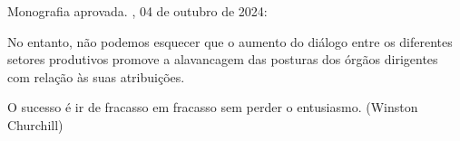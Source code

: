 \documentclass[
	12pt,				%
	oneside,			%
	a4paper,			%
	english,			%
	french,				%
	spanish,			%
	brazil				%
	]{abntex2}
\renewcommand{\ABNTEXchapterfont}{\normalfont} %
\begin{document}
\begin{folhadeaprovacao}

  \begin{center}
    {\ABNTEXchapterfont\large\imprimirautor}

    \vspace*{\fill}\vspace*{\fill}
    \begin{center}
      \ABNTEXchapterfont\bfseries\Large\imprimirtitulo
    \end{center}
    \vspace*{\fill}

    \hspace{.45\textwidth}
    \begin{minipage}{.5\textwidth}

    \imprimirpreambulo

    \end{minipage}%
    \vspace*{\fill}
   \end{center}

   Monografia aprovada. \imprimirlocal, 04 de outubro de 2024:


   \begin{center}
    \vspace*{0.5cm}
    {\large\imprimirlocal}
    \par
    {\large\imprimirdata}
    \vspace*{1cm}
  \end{center}

\end{folhadeaprovacao}
\begin{agradecimentos}

No entanto, não podemos esquecer que o aumento do diálogo entre os
diferentes setores produtivos promove a alavancagem das posturas dos
órgãos dirigentes com relação às suas atribuições.

\end{agradecimentos}
\begin{epigrafe}
    \vspace*{\fill}
	\begin{flushright}

  O sucesso é ir de fracasso em fracasso sem perder o entusiasmo. (Winston
  Churchill)

	\end{flushright}
\end{epigrafe}
\end{document}
